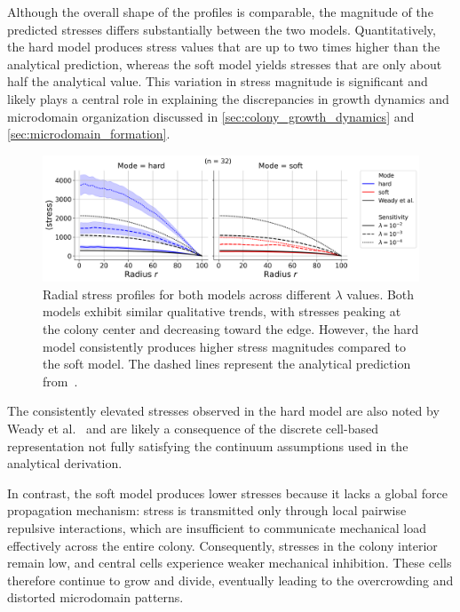 \documentclass[conference]{IEEEtran}
\begin{document}
Although the overall shape of the profiles is comparable, the magnitude of the predicted stresses differs substantially between the two models. Quantitatively, the hard model produces stress values that are up to two times higher than the analytical prediction, whereas the soft model yields stresses that are only about half the analytical value. This variation in stress magnitude is significant and likely plays a central role in explaining the discrepancies in growth dynamics and microdomain organization discussed in \autoref{sec:colony_growth_dynamics} and \autoref{sec:microdomain_formation}.

\begin{figure}[b]
    \centering
    \includegraphics[width=\linewidth]{figures/comparison_plots/combined_stress_shared.png}
    \caption{Radial stress profiles for both models across different $\lambda$ values. Both models exhibit similar qualitative trends, with stresses peaking at the colony center and decreasing toward the edge. However, the hard model consistently produces higher stress magnitudes compared to the soft model. The dashed lines represent the analytical prediction from~\cite{Weady2024SM}.}
    \label{fig:radial_distribution_stress}
\end{figure}

The consistently elevated stresses observed in the hard model are also noted by Weady et al.~\cite{Weady2024} and are likely a consequence of the discrete cell-based representation not fully satisfying the continuum assumptions used in the analytical derivation.

In contrast, the soft model produces lower stresses because it lacks a global force propagation mechanism: stress is transmitted only through local pairwise repulsive interactions, which are insufficient to communicate mechanical load effectively across the entire colony. Consequently, stresses in the colony interior remain low, and central cells experience weaker mechanical inhibition. These cells therefore continue to grow and divide, eventually leading to the overcrowding and distorted microdomain patterns.
\end{document}
